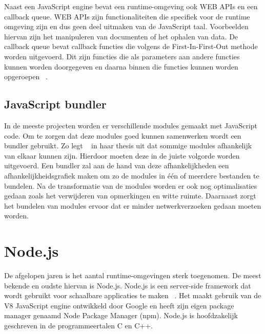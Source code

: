 Naast een JavaScript engine bevat een runtime-omgeving ook WEB APIs en een callback queue. 
WEB APIs zijn functionaliteiten die specifiek voor de runtime omgeving zijn en dus geen deel uitmaken van de JavaScript taal.
Voorbeelden hiervan zijn het manipuleren van documenten of het ophalen van data.
De callback queue bevat callback functies die volgens de First-In-First-Out methode worden uitgevoerd.
Dit zijn functies die als parameters aan andere functies kunnen worden doorgegeven en 
daarna binnen die functies kunnen worden opgeroepen ~\autocite{Eygi2020}.

\subsection{JavaScript bundler}
In de meeste projecten worden er verschillende modules gemaakt met JavaScript code. 
Om te zorgen dat deze modules goed kunnen samenwerken wordt een bundler gebruikt. 
Zo legt ~\textcite{Laurila2020} in haar thesis uit dat sommige modules afhankelijk van elkaar kunnen zijn. 
Hierdoor moeten deze in de juiste volgorde worden uitgevoerd. Een bundler zal aan de hand van deze afhankelijkheden 
een afhankelijkheidsgrafiek maken om zo de modules in één of meerdere bestanden te bundelen. 
Na de transformatie van de modules worden er ook nog optimalisaties gedaan zoals het verwijderen van opmerkingen en witte ruimte.
Daarnaast zorgt het bundelen van modules ervoor dat er minder netwerkverzoeken gedaan moeten worden.

\section{Node.js}
De afgelopen jaren is het aantal runtime-omgevingen sterk toegenomen. De meest bekende en oudste hiervan is Node.js.
Node.js is een server-side framework dat wordt gebruikt voor schaalbare applicaties te maken ~\autocite{Gackenheimer2013}.
Het maakt gebruik van de V8 JavaScript engine ontwikkeld door Google en heeft zijn eigen package manager genaamd Node Package Manager (npm).
Node.js is hoofdzakelijk geschreven in de programmeertalen C en C++.


